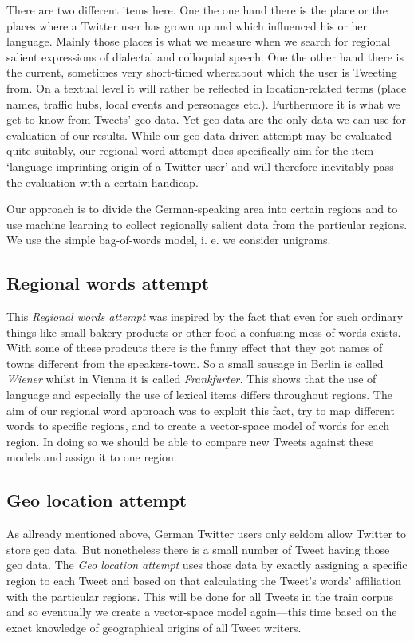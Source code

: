 \documentclass[../Main.tex]{subfiles}
\begin{document}
There are two different items here. One the one hand there is the place or the places where a Twitter user has grown up and which influenced his or her language. Mainly those places is what we measure when we search for regional salient expressions of dialectal and colloquial speech. One the other hand there is the current, sometimes very short-timed whereabout which the user is Tweeting from. On a textual level it will rather be reflected in location-related terms (place names, traffic hubs, local events and personages etc.). Furthermore it is what we get to know from Tweets' geo data. Yet geo data are the only data we can use for evaluation of our results. While our geo data driven attempt may be evaluated quite suitably, our regional word attempt does specifically aim for the item `language-imprinting origin of a Twitter user' and will therefore inevitably pass the evaluation with a certain handicap.

Our approach is to divide the German-speaking area into certain regions and to use machine learning to collect regionally salient data from the particular regions. We use the simple bag-of-words model, i. e. we consider unigrams.

\subsection{Regional words attempt}
This \emph{Regional words attempt} was inspired by the fact that even for such ordinary things like small bakery products or other food a confusing mess of words exists. With some of these prodcuts there is the funny effect that they got names of towns different from the speakers-town. So a small sausage in Berlin is called \textit{Wiener} whilst in Vienna it is called \textit{Frankfurter.} This shows that the use of language and especially the use of lexical items differs throughout regions. The aim of our regional word approach was to exploit this fact, try to map different words to specific regions, and to create a vector-space model of words for each region. In doing so we should be able to compare new Tweets against these models and assign it to one region.

\subsection{Geo location attempt}
As allready mentioned above, German Twitter users only seldom allow Twitter to store geo data. But nonetheless there is a small number of Tweet having those geo data. The \emph{Geo location attempt} uses those data by exactly assigning a specific region to each Tweet and based on that calculating the Tweet's words' affiliation with the particular regions. This will be done for all Tweets in the train corpus and so eventually we create a vector-space model again---this time based on the exact knowledge of geographical origins of all Tweet writers.
\end{document}
